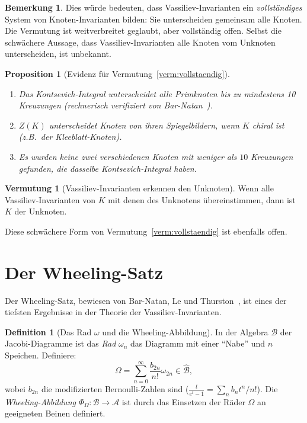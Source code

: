 \documentclass[12pt,a4paper]{amsart}
\newtheorem{proposition}[theorem]{Proposition}
\theoremstyle{definition}
\newtheorem{vermutung}[theorem]{Vermutung}
\newtheorem{bemerkung}[theorem]{Bemerkung}
\newtheorem{definition_de}[theorem]{Definition}
\begin{document}
\begin{bemerkung}
Dies würde bedeuten, dass Vassiliev-Invarianten ein \emph{vollständiges}
System von Knoten-Invarianten bilden: Sie unterscheiden gemeinsam alle Knoten.
Die Vermutung ist weitverbreitet geglaubt, aber vollständig offen.  Selbst
die schwächere Aussage, dass Vassiliev-Invarianten alle Knoten vom Unknoten
unterscheiden, ist unbekannt.
\end{bemerkung}

\begin{proposition}[Evidenz für Vermutung~\ref{verm:vollstaendig}]
\begin{enumerate}[label=(\roman*)]
  \item Das Kontsevich-Integral unterscheidet alle \emph{Primknoten} bis
        zu mindestens 10 Kreuzungen (rechnerisch verifiziert von
        Bar-Natan~\cite{barnatan1995}).
  \item $Z(K)$ unterscheidet Knoten von ihren Spiegelbildern, wenn $K$
        chiral ist (z.B.\ der Kleeblatt-Knoten).
  \item Es wurden keine zwei verschiedenen Knoten mit weniger als $10$
        Kreuzungen gefunden, die dasselbe Kontsevich-Integral haben.
\end{enumerate}
\end{proposition}

\begin{vermutung}[Vassiliev-Invarianten erkennen den Unknoten]\label{verm:unknoten}
Wenn alle Vassiliev-Invarianten von $K$ mit denen des Unknotens
übereinstimmen, dann ist $K$ der Unknoten.
\end{vermutung}

Diese schwächere Form von Vermutung~\ref{verm:vollstaendig} ist ebenfalls offen.

\section{Der Wheeling-Satz}\label{sec:wheeling}

Der Wheeling-Satz, bewiesen von Bar-Natan, Le und Thurston~\cite{barnatan2003},
ist eines der tiefsten Ergebnisse in der Theorie der Vassiliev-Invarianten.

\begin{definition_de}[Das Rad $\omega$ und die Wheeling-Abbildung]
In der Algebra $\mathcal{B}$ der Jacobi-Diagramme ist das \emph{Rad}
$\omega_n$ das Diagramm mit einer ``Nabe'' und $n$ Speichen.
Definiere:
\[
  \Omega = \sum_{n=0}^\infty \frac{b_{2n}}{n!} \omega_{2n}
  \in \hat{\mathcal{B}},
\]
wobei $b_{2n}$ die modifizierten Bernoulli-Zahlen sind
($\frac{t}{e^t-1} = \sum_n b_n t^n/n!$).
Die \emph{Wheeling-Abbildung} $\Phi_\Omega: \mathcal{B} \to \mathcal{A}$
ist durch das Einsetzen der Räder $\Omega$ an geeigneten Beinen definiert.
\end{definition_de}
\end{document}
